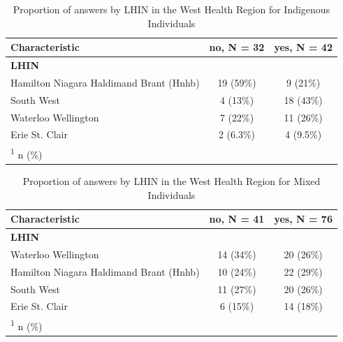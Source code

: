 \documentclass[
  letterpaper,
  DIV=11,
  numbers=noendperiod]{scrartcl}
\begin{document}
\hypertarget{tbl-west-region-indigenous}{}
\begin{table}
\caption{\label{tbl-west-region-indigenous}Proportion of answers by LHIN in the West Health Region for Indigenous
Individuals }\tabularnewline

\centering
\begin{tabular}{lcc}
\toprule
\textbf{Characteristic} & \textbf{no}, N = 32 & \textbf{yes}, N = 42\\
\midrule
\textbf{LHIN} &  & \\
\hspace{1em}Hamilton Niagara Haldimand Brant (Hnhb) & 19 (59\%) & 9 (21\%)\\
\hspace{1em}South West & 4 (13\%) & 18 (43\%)\\
\hspace{1em}Waterloo Wellington & 7 (22\%) & 11 (26\%)\\
\hspace{1em}Erie St. Clair & 2 (6.3\%) & 4 (9.5\%)\\
\bottomrule
\multicolumn{3}{l}{\rule{0pt}{1em}\textsuperscript{1} n (\%)}\\
\end{tabular}
\end{table}

\hypertarget{tbl-west-region-mixed}{}
\begin{table}
\caption{\label{tbl-west-region-mixed}Proportion of answers by LHIN in the West Health Region for Mixed
Individuals }\tabularnewline

\centering
\begin{tabular}{lcc}
\toprule
\textbf{Characteristic} & \textbf{no}, N = 41 & \textbf{yes}, N = 76\\
\midrule
\textbf{LHIN} &  & \\
\hspace{1em}Waterloo Wellington & 14 (34\%) & 20 (26\%)\\
\hspace{1em}Hamilton Niagara Haldimand Brant (Hnhb) & 10 (24\%) & 22 (29\%)\\
\hspace{1em}South West & 11 (27\%) & 20 (26\%)\\
\hspace{1em}Erie St. Clair & 6 (15\%) & 14 (18\%)\\
\bottomrule
\multicolumn{3}{l}{\rule{0pt}{1em}\textsuperscript{1} n (\%)}\\
\end{tabular}
\end{table}
\end{document}
